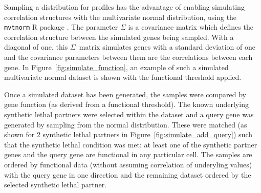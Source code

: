 Sampling a distribution for  profiles has the advantage of enabling simulating correlation structures with the multivariate normal distribution, using the \texttt{mvtnorm} R package \citep{Genz2009, mvtnorm}. The parameter $\Sigma$ is a covariance matrix which defines the correlation structure between the simulated genes being sampled. With a diagonal of one, this $\Sigma$\ matrix simulates genes with a standard deviation of one and the covariance parameters between them are the correlations between each gene. In Figure~\ref{fig:simulate_function}, an example of such a simulated multivariate normal dataset is shown with the functional threshold applied.

Once a simulated dataset has been generated, the samples were compared by gene function (as derived from a functional threshold). The known underlying \gls{synthetic lethal} partners were selected within the dataset and a query gene was generated by sampling from the normal distribution. These were matched (as shown for 2 \gls{synthetic lethal} partners in Figure~\ref{fig:simulate_add_query}) such that the \gls{synthetic lethal} condition was met: at least one of the synthetic partner genes and the query gene are functional in any particular cell. The samples are ordered by functional data (without assuming correlation of underyling  values) with the query gene in one direction and the remaining dataset ordered by the selected \gls{synthetic lethal} partner.


